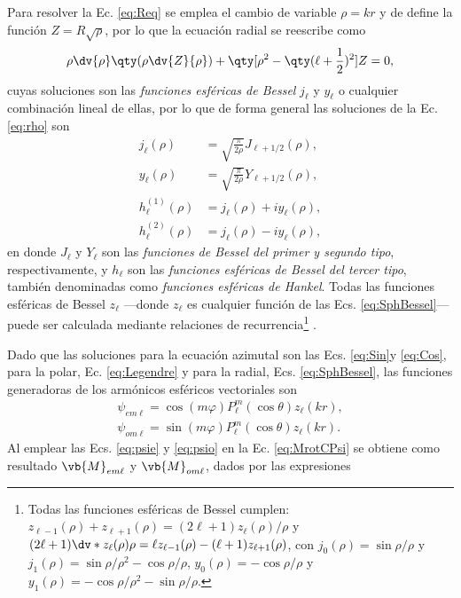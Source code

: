 Para resolver la Ec. \eqref{eq:Req} se emplea el cambio de variable $\rho = k r$ y de define la función $Z =R\sqrt{\rho}$, por lo que la ecuación radial se reescribe como 
	\begin{align}
	\rho \dv{\rho}\qty(\rho\dv{Z}{\rho})+\qty[\rho^2-\qty(\ell+\frac12)^2] Z = 0,
	\label{eq:rho}
	\end{align}
cuyas soluciones son las \emph{funciones esféricas de Bessel} $j_\ell$ y $y_\ell$ o cualquier combinación lineal de ellas, por lo que de forma general las soluciones de la Ec. \eqref{eq:rho} son \cite{arfken2001methods} 
%
	\begin{subequations}\begin{align}
	j_\ell (\rho) &= \sqrt{\frac{\pi}{2\rho}} J_{\ell+1/2}(\rho), \label{eqs:jn}\\
	y_\ell (\rho) &= \sqrt{\frac{\pi}{2\rho}} Y_{\ell+1/2}(\rho), \label{eqs:yn}\\
	h_\ell^{(1)} (\rho) &= j_\ell(\rho) + i y_\ell(\rho), \label{eqs:h1}\\
	h_\ell^{(2)} (\rho) &=  j_\ell(\rho) - i y_\ell(\rho), \label{eqs:h2}
	\end{align}			\label{eq:SphBessel}	\end{subequations}
%
en donde $J_\ell$ y $Y_\ell$ son las \emph{funciones de Bessel del primer y segundo tipo}, respectivamente, y $h_\ell$ son las \emph{funciones esféricas de Bessel del tercer tipo}, también denominadas como \emph{funciones esféricas de Hankel}. Todas las funciones esféricas de Bessel $z_\ell$ ---donde $z_\ell$ es cualquier función de las Ecs. \eqref{eq:SphBessel}--- puede ser calculada mediante relaciones de recurrencia\footnote{Todas las funciones esféricas de Bessel cumplen: $	z_{\ell-1}(\rho) + z_{\ell+1}(\rho) =(2\ell+1)z_\ell(\rho)/\rho$ y $(2\ell + 1) \dv*{z_\ell(\rho)}{\rho} = \ell z_{\ell-1}(\rho) - (\ell+1)z_{\ell+1}(\rho)$, con  $j_0(\rho) = \sin\rho / \rho$ y $j_1(\rho) = \sin\rho / \rho^2- \cos\rho/\rho$, $y_0(\rho) = -\cos\rho/\rho$ y $y_1(\rho) = -\cos\rho/\rho^2-\sin\rho/\rho$.} \cite{arfken2001methods}.

Dado que las soluciones para la ecuación azimutal son las Ecs. \eqref{eq:Sin}y \eqref{eq:Cos}, para la polar, Ec. \eqref{eq:Legendre} y para la radial, Ecs. \eqref{eq:SphBessel}, las funciones generadoras de los armónicos esféricos vectoriales son
%
	\begin{align}
	\psi_{em\ell} = \cos(m\varphi) P_\ell^m( \cos \theta) z_\ell(k r),\label{eq:psie}\\
	\psi_{om\ell} = \sin(m\varphi) P_\ell^m( \cos \theta) z_\ell(k r).\label{eq:psio}
	\end{align}
%
Al emplear las Ecs. \eqref{eq:psie} y \eqref{eq:psio} en la Ec. \eqref{eq:MrotCPsi} se obtiene como resultado $\vb{M}_{em\ell}$ y $\vb{M}_{om\ell}$, dados por las expresiones 

